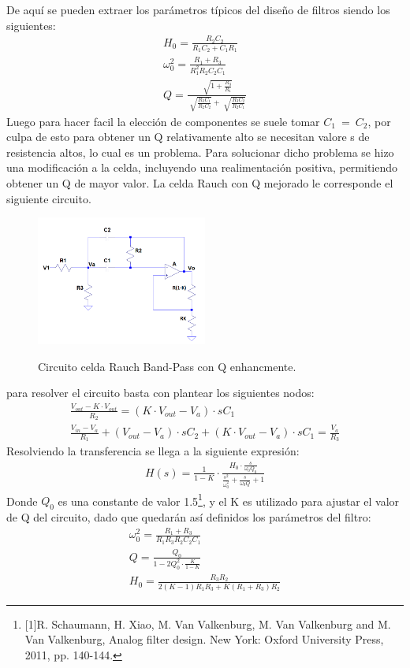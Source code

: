 De aquí se pueden extraer los parámetros típicos del diseño de filtros siendo los siguientes:
\begin{align}
H_0 =\frac{R_2C_2}{R_1C_2+C_1R_1}\\
\omega_0^2= \frac{R_1+R_3}{R_1^2R_2C_2C_1}\\
Q= \frac{\sqrt[]{1+\frac{R_3}{R_1}}}{{\sqrt[]{\frac{R_3C_1}{R_2C_2}}+\sqrt[]{\frac{R_3C_2}{R_2C_1}}}}
\end{align}
Luego para hacer facil la elección de componentes se suele tomar $C_1 \ = \ C_2$, por culpa de esto para obtener un Q relativamente alto se necesitan valore s de resistencia altos, lo cual es un problema.
Para solucionar dicho problema se hizo una modificación a la celda, incluyendo una realimentación positiva, permitiendo obtener un Q de mayor valor.
La celda Rauch con Q mejorado le corresponde el siguiente circuito.
\begin{figure}[H]
	\centering
	\includegraphics[width=0.5\textwidth]{Imagenes-Ej2/Circuit.PNG}
	\label{fig:graph}
	\caption{Circuito celda Rauch Band-Pass con Q enhancmente.}
\end{figure}
para resolver el circuito basta con plantear los siguientes nodos:
\begin{align}
\frac{V_{out}-K \cdot V_{out}}{R_2}=(K \cdot V_{out}-V_a)\cdot sC_1\\ 
\frac{V_{in}-V_a}{R_1}+(V_{out}-V_a)\cdot sC_2 +(K \cdot V_{out}-V_a) \cdot sC_1 = \frac{V_a}{R_3}
\end{align}
Resolviendo la transferencia se llega a la siguiente expresión:
\begin{align}
H(s)=\frac{1}{1-K} \cdot \frac{H_0 \cdot \frac{s}{\omega_0 Q_0}}{\frac{s^2}{\omega_0^2}+\frac{s}{\omega_0Q}+1}
\end{align}
Donde $Q_0$ es una constante de valor 1.5\footnote{[1]R. Schaumann, H. Xiao, M. Van Valkenburg, M. Van Valkenburg and M. Van Valkenburg, Analog filter design. New York: Oxford University Press, 2011, pp. 140-144.}, y el K es utilizado para ajustar el valor de Q del circuito, dado que quedarán así definidos los parámetros del filtro:
\begin{align}
\omega_0^2= \frac{R_1+R_3}{R_1R_3R_2C_2C_1}\\
Q=\frac{Q_0}{1-2Q_0^2\cdot \frac{K}{1-K}}\\
H_0=\frac{R_3R_2}{2(K-1)R_1R_3+K(R_1+R_3)R_2}
\end{align}
